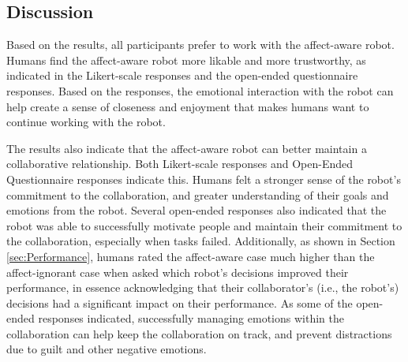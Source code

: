 \documentclass[12pt]{report}
\begin{document}
% 
% 

\subsection{Discussion}
Based on the results, all participants prefer to work with the affect-aware
robot. Humans find the affect-aware robot more likable and more trustworthy, as
indicated in the Likert-scale responses and the open-ended questionnaire
responses. Based on the responses, the emotional interaction with the robot can
help create a sense of closeness and enjoyment that makes humans want to
continue working with the robot.

The results also indicate that the affect-aware robot can better maintain a
collaborative relationship. Both Likert-scale responses and Open-Ended
Questionnaire responses indicate this. Humans felt a stronger sense of the
robot's commitment to the collaboration, and greater understanding of their
goals and emotions from the robot. Several open-ended responses also indicated
that the robot was able to successfully motivate people and maintain their
commitment to the collaboration, especially when tasks failed. Additionally, as
shown in Section \ref{sec:Performance}, humans rated the affect-aware case much
higher than the affect-ignorant case when asked which robot's decisions
improved their performance, in essence acknowledging that their collaborator's
(i.e., the robot's) decisions had a significant impact on their performance. As
some of the open-ended responses indicated, successfully managing emotions
within the collaboration can help keep the collaboration on track, and prevent
distractions due to guilt and other negative emotions.
\end{document}
